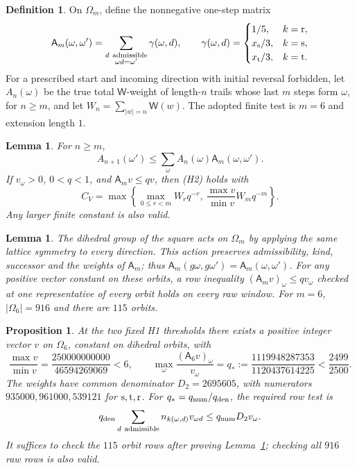 \documentclass[11pt,reqno]{amsart}
\newtheorem{lemma}[theorem]{Lemma}
\newtheorem{proposition}[theorem]{Proposition}
\theoremstyle{definition}
\newtheorem{definition}[theorem]{Definition}
\theoremstyle{remark}
\begin{document}
\begin{definition}\label{d:memorygrowth}
On \(\Omega_m\), define the nonnegative one-step matrix
\[
 \mathsf A_m(\omega,\omega')=
 \sum_{\substack{d\ {\rm admissible}\\\omega d=\omega'}}
 \gamma(\omega,d),\qquad
 \gamma(\omega,d)=
 \begin{cases}1/5,&k={\rm r},\\
 x_{\rm s}/3,&k={\rm s},\\x_{\rm t}/3,&k={\rm t}.
 \end{cases}
\]
For a prescribed start and incoming direction with initial reversal
forbidden, let \(A_n(\omega)\) be the true total \(\mathsf W\)-weight
of length-\(n\) trails whose last \(m\) steps form \(\omega\),
for \(n\ge m\), and let \(W_n=\sum_{|w|=n}\mathsf W(w)\).
The adopted finite test is \(m=6\) and extension length \(1\).
\end{definition}

\begin{lemma}\label{l:alm}
For \(n\ge m\),
\[
 A_{n+1}(\omega')\le\sum_\omega A_n(\omega)\mathsf A_m(\omega,\omega').
\]
If \(v_\omega>0\), \(0<q<1\), and \(\mathsf A_mv\le qv\),
then (H2) holds with
\[
 C_V=\max\left\{
      \max_{0\le r<m}W_rq^{-r},\
      \frac{\max v}{\min v}W_mq^{-m}\right\}.
\]
Any larger finite constant is also valid.
\end{lemma}

\begin{lemma}\label{l:H2-dihedral}
The dihedral group of the square acts on \(\Omega_m\) by applying
the same lattice symmetry to every direction. This action preserves
admissibility, kind, successor and the weights of \(\mathsf A_m\);
thus \(\mathsf A_m(g\omega,g\omega')=\mathsf A_m(\omega,\omega')\).
For any positive vector constant on these orbits, a row inequality
\((\mathsf A_mv)_\omega\le qv_\omega\) checked at one representative
of every orbit holds on every raw window.
For \(m=6\), \(|\Omega_6|=916\) and there are \(115\) orbits.
\end{lemma}

\begin{proposition}\label{p:H2-test}
At the two fixed H1 thresholds there exists a positive integer
vector \(v\) on \(\Omega_6\), constant on dihedral orbits, with
\[
 \frac{\max v}{\min v}=\frac{250000000000}{46594269069}<6,\qquad
 \max_\omega\frac{(\mathsf A_6v)_\omega}{v_\omega}
       =q_*:=\frac{1119948287353}{1120437614225}<\frac{2499}{2500}.
\]
The weights have common denominator \(D_2=2695605\), with
numerators \(935000,961000,539121\) for \({\rm s},{\rm t},{\rm r}\).
For \(q_*=q_{\rm num}/q_{\rm den}\), the required row test is
\[
 q_{\rm den}\sum_{d\ {\rm admissible}}n_{k(\omega,d)}v_{\omega d}
          \le q_{\rm num}D_2v_\omega .
\]
It suffices to check the \(115\) orbit rows after proving
Lemma~\ref{l:H2-dihedral}; checking all \(916\) raw rows is also valid.
\end{proposition}
\end{document}

